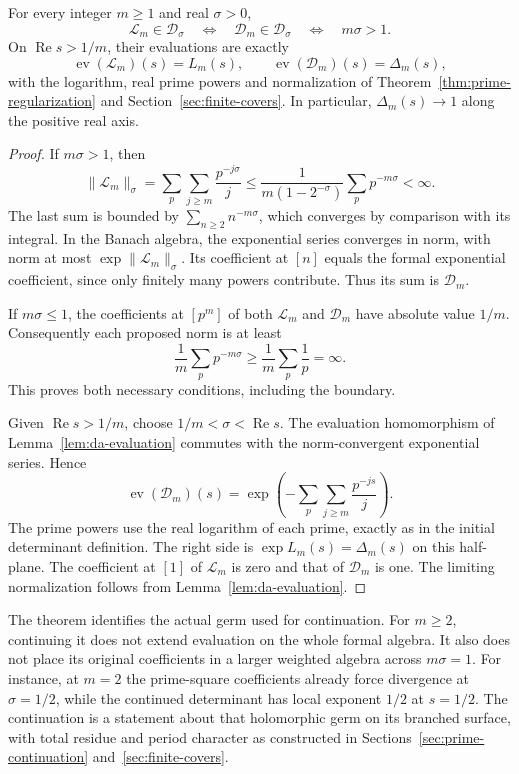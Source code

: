 \begin{theorem}
\label{thm:da-coefficient-domain}
For every integer $m\geq1$ and real $\sigma>0$,
\[
 \mathscr L_m\in\mathscr D_\sigma
 \quad\Longleftrightarrow\quad
 \mathscr D_m\in\mathscr D_\sigma
 \quad\Longleftrightarrow\quad m\sigma>1.
\]
On $\operatorname{Re}s>1/m$, their evaluations are exactly
\[
 \operatorname{ev}(\mathscr L_m)(s)=L_m(s),\qquad
 \operatorname{ev}(\mathscr D_m)(s)=\Delta_m(s),
\]
with the logarithm, real prime powers and normalization of
Theorem~\ref{thm:prime-regularization} and
Section~\ref{sec:finite-covers}. In particular,
$\Delta_m(s)\to1$ along the positive real axis.
\end{theorem}
\begin{proof}
If $m\sigma>1$, then
\[
 \|\mathscr L_m\|_\sigma
 =\sum_p\sum_{j\geq m}\frac{p^{-j\sigma}}j
 \leq\frac1{m(1-2^{-\sigma})}\sum_p p^{-m\sigma}
 <\infty.
\]
The last sum is bounded by $\sum_{n\geq2}n^{-m\sigma}$, which
converges by comparison with its integral.
In the Banach algebra, the exponential series converges in norm,
with norm at most $\exp\|\mathscr L_m\|_\sigma$.
Its coefficient at $[n]$ equals the formal exponential coefficient,
since only finitely many powers contribute. Thus its sum is
$\mathscr D_m$.

If $m\sigma\leq1$, the coefficients at $[p^m]$ of both
$\mathscr L_m$ and $\mathscr D_m$ have absolute value $1/m$.
Consequently each proposed norm is at least
\[
 \frac1m\sum_p p^{-m\sigma}\geq\frac1m\sum_p\frac1p=\infty.
\]
This proves both necessary conditions, including the boundary.

Given $\operatorname{Re}s>1/m$, choose
$1/m<\sigma<\operatorname{Re}s$.
The evaluation homomorphism of Lemma~\ref{lem:da-evaluation}
commutes with the norm-convergent exponential series. Hence
\[
 \operatorname{ev}(\mathscr D_m)(s)
 =\exp\left(-\sum_p\sum_{j\geq m}\frac{p^{-js}}j\right).
\]
The prime powers use the real logarithm of each prime, exactly as
in the initial determinant definition. The right side is
$\exp L_m(s)=\Delta_m(s)$ on this half-plane.
The coefficient at $[1]$ of $\mathscr L_m$ is zero and that of
$\mathscr D_m$ is one. The limiting normalization follows from
Lemma~\ref{lem:da-evaluation}.
\end{proof}

The theorem identifies the actual germ used for continuation.
For $m\geq2$, continuing it does not extend evaluation on the whole
formal algebra. It also does not place its original coefficients
in a larger weighted algebra across $m\sigma=1$.
For instance, at $m=2$ the prime-square coefficients already force
divergence at $\sigma=1/2$, while the continued determinant has
local exponent $1/2$ at $s=1/2$.
The continuation is a statement about that holomorphic germ on its
branched surface, with total residue and period character as
constructed in Sections~\ref{sec:prime-continuation}
and~\ref{sec:finite-covers}.

